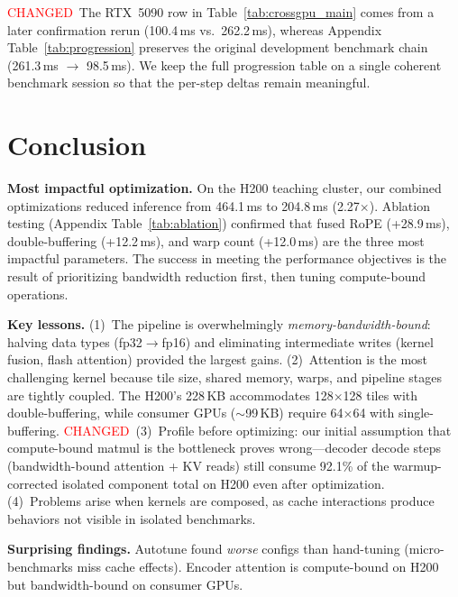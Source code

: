 \documentclass{article}
\newcommand{\chg}[1]{{\color{blue}#1}}
\newcommand{\chglabel}{{\setlength{\fboxsep}{1pt}\colorbox{yellow!45}{\textcolor{red}{\scriptsize CHANGED}}}}
\begin{document}
\chglabel\ \chg{The RTX~5090 row in Table~\ref{tab:crossgpu_main} comes from a later confirmation rerun (100.4\,ms vs.\ 262.2\,ms), whereas Appendix Table~\ref{tab:progression} preserves the original development benchmark chain (261.3\,ms $\rightarrow$ 98.5\,ms).  We keep the full progression table on a single coherent benchmark session so that the per-step deltas remain meaningful.}

\section{Conclusion}\label{sec:conclusion}

\textbf{Most impactful optimization.}
On the H200 teaching cluster, our combined optimizations reduced inference from 464.1\,ms to 204.8\,ms (2.27$\times$).  Ablation testing (Appendix Table~\ref{tab:ablation}) confirmed that fused RoPE (+28.9\,ms), double-buffering (+12.2\,ms), and warp count (+12.0\,ms) are the three most impactful parameters.
The success in meeting the performance objectives is the result of prioritizing bandwidth reduction first, then tuning compute-bound operations.

\textbf{Key lessons.}
(1)~The pipeline is overwhelmingly \emph{memory-bandwidth-bound}: halving data types (fp32$\to$fp16) and eliminating intermediate writes (kernel fusion, flash attention) provided the largest gains.
(2)~Attention is the most challenging kernel because tile size, shared memory, warps, and pipeline stages are tightly coupled. The H200's 228\,KB accommodates 128$\times$128 tiles with double-buffering, while consumer GPUs ($\sim$99\,KB) require 64$\times$64 with single-buffering.
\chglabel\ \chg{(3)~Profile before optimizing: our initial assumption that compute-bound matmul is the bottleneck proves wrong---decoder decode steps (bandwidth-bound attention + KV reads) still consume 92.1\% of the warmup-corrected isolated component total on H200 even after optimization.}
(4)~Problems arise when kernels are composed, as cache interactions produce behaviors not visible in isolated benchmarks.

\textbf{Surprising findings.}
Autotune found \emph{worse} configs than hand-tuning (micro-benchmarks miss cache effects). Encoder attention is compute-bound on H200 but bandwidth-bound on consumer GPUs.
\clearpage


\end{document}
